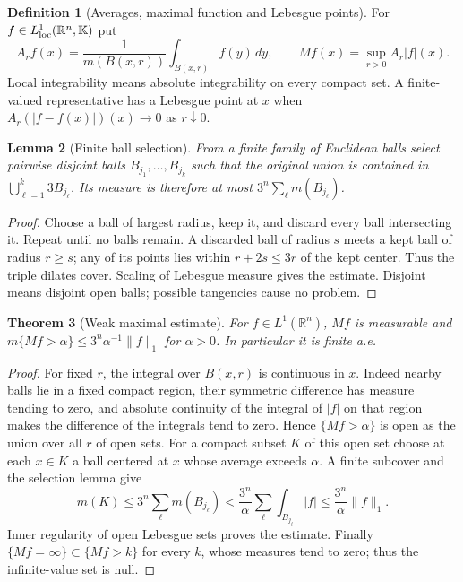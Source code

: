 \documentclass[11pt,oneside,openany]{book}
\newtheorem{theorem}{Theorem}[chapter]
\newtheorem{lemma}[theorem]{Lemma}
\theoremstyle{definition}
\newtheorem{definition}[theorem]{Definition}
\theoremstyle{remark}
\newcommand{\R}{\mathbb R}\newcommand{\C}{\mathbb C}
\newcommand{\family}[1]{}
\begin{document}
\begin{definition}[Averages, maximal function and Lebesgue points]\family{D11.13.averages_maximal_definition}\label{d11:13:averages-maximal-definition}
For $f\in L^1_{\rm loc}(\R^n,\mathbb K)$ put
\[
 A_rf(x)=\frac1{m(B(x,r))}\int_{B(x,r)}f(y)\,dy,
 \qquad Mf(x)=\sup_{r>0}A_r|f|(x).
\]
Local integrability means absolute integrability on every compact set.
A finite-valued representative has a Lebesgue point at $x$ when
$A_r(|f-f(x)|)(x)\to0$ as $r\downarrow0$.
\end{definition}

\begin{lemma}[Finite ball selection]\family{D11.13.finite_ball_covering}\label{d11:13:finite-ball-covering}
From a finite family of Euclidean balls select pairwise disjoint balls
$B_{j_1},\ldots,B_{j_k}$ such that the original union is contained in
$\bigcup_{\ell=1}^k3B_{j_\ell}$. Its measure is therefore at most
$3^n\sum_\ell m(B_{j_\ell})$.
\end{lemma}
\begin{proof}
Choose a ball of largest radius, keep it, and discard every ball intersecting
it. Repeat until no balls remain. A discarded ball of radius $s$ meets a
kept ball of radius $r\geq s$; any of its points lies within $r+2s\leq3r$
of the kept center. Thus the triple dilates cover. Scaling of Lebesgue
measure gives the estimate. Disjoint means disjoint open balls; possible
tangencies cause no problem.
\end{proof}

\begin{theorem}[Weak maximal estimate]\family{D11.13.maximal_weak11}\label{d11:13:maximal-weak11}
For $f\in L^1(\R^n)$, $Mf$ is measurable and
$m\{Mf>\alpha\}\leq3^n\alpha^{-1}\|f\|_1$ for $\alpha>0$.
In particular it is finite a.e.
\end{theorem}
\begin{proof}
For fixed $r$, the integral over $B(x,r)$ is continuous in $x$.
Indeed nearby balls lie in a fixed compact region, their symmetric
difference has measure tending to zero, and absolute continuity of the
integral of $|f|$ on that region makes the difference of the integrals tend
to zero. Hence $\{Mf>\alpha\}$ is open as the union over all $r$ of
open sets. For a compact subset $K$ of this open set choose at each
$x\in K$ a ball centered at $x$ whose average exceeds $\alpha$.
A finite subcover and the selection lemma give
\[
 m(K)\leq3^n\sum_\ell m(B_{j_\ell})
 <\frac{3^n}{\alpha}\sum_\ell\int_{B_{j_\ell}}|f|
 \leq\frac{3^n}{\alpha}\|f\|_1.
\]
Inner regularity of open Lebesgue sets proves the estimate. Finally
$\{Mf=\infty\}\subset\{Mf>k\}$ for every $k$, whose measures tend to
zero; thus the infinite-value set is null.
\end{proof}
\end{document}
